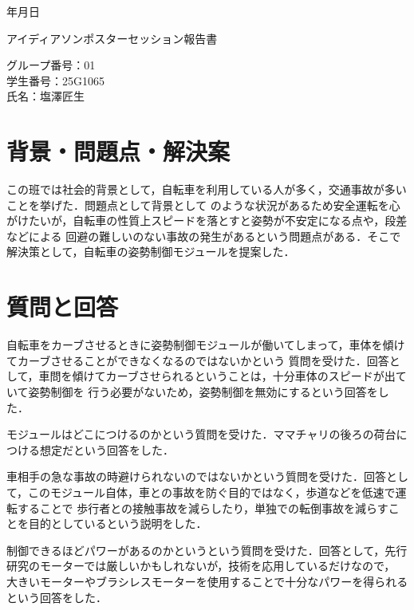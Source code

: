 \documentclass[uplatex]{jsarticle}
\begin{document}
\begin{flushright}
    \number\year 年\number\month 月\number\day 日
\end{flushright}

\begin{center}
    {\LARGE アイディアソンポスターセッション報告書}
\end{center}

\begin{flushright}
    グループ番号：01\\
    学生番号：25G1065\\
    氏名：塩澤匠生
\end{flushright}


\section{背景・問題点・解決案}
この班では社会的背景として，自転車を利用している人が多く，交通事故が多いことを挙げた．問題点として背景として
のような状況があるため安全運転を心がけたいが，自転車の性質上スピードを落とすと姿勢が不安定になる点や，段差などによる
回避の難しいのない事故の発生があるという問題点がある．そこで解決策として，自転車の姿勢制御モジュールを提案した．


\section{質問と回答}
自転車をカーブさせるときに姿勢制御モジュールが働いてしまって，車体を傾けてカーブさせることができなくなるのではないかという
質問を受けた．回答として，車問を傾けてカーブさせられるということは，十分車体のスピードが出ていて姿勢制御を
行う必要がないため，姿勢制御を無効にするという回答をした．

モジュールはどこにつけるのかという質問を受けた．ママチャリの後ろの荷台につける想定だという回答をした．

車相手の急な事故の時避けられないのではないかという質問を受けた．回答として，このモジュール自体，車との事故を防ぐ目的ではなく，歩道などを低速で運転することで
歩行者との接触事故を減らしたり，単独での転倒事故を減らすことを目的としているという説明をした．

制御できるほどパワーがあるのかというという質問を受けた．回答として，先行研究のモーターでは厳しいかもしれないが，技術を応用しているだけなので，
大きいモーターやブラシレスモーターを使用することで十分なパワーを得られるという回答をした．
\end{document}
